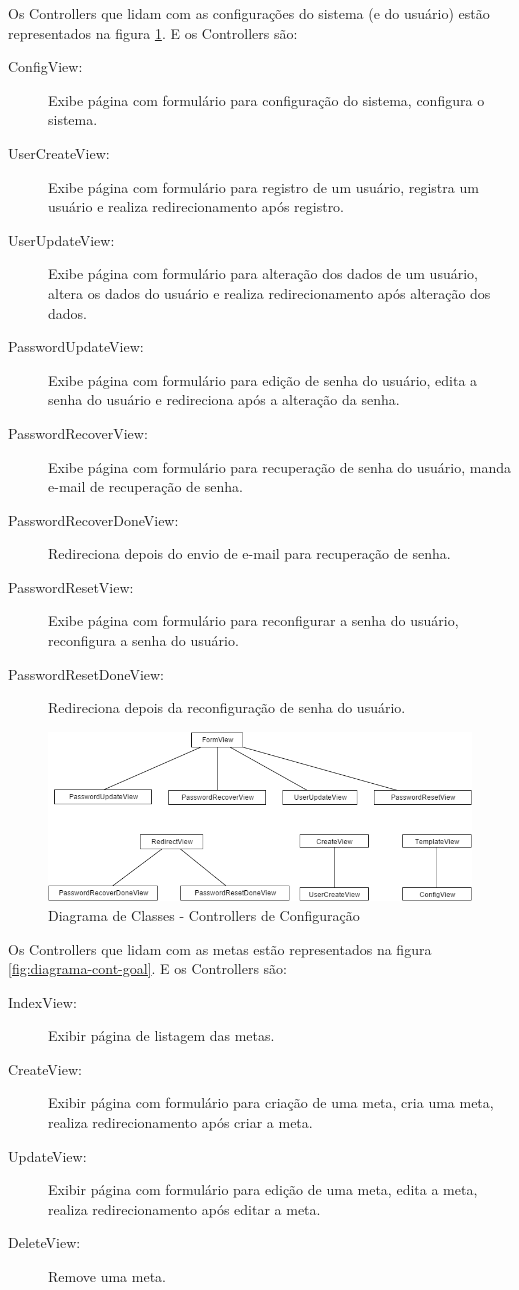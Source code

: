 Os Controllers que lidam com as configurações do sistema (e do usuário) estão representados na figura \ref{fig:diagrama-cont-configuration}. E os Controllers são:
\begin{description}
	\item[ConfigView:] Exibe página com formulário para configuração do sistema, configura o sistema.
	\item[UserCreateView:] Exibe página com formulário para registro de um usuário, registra um usuário e realiza redirecionamento após registro.
	\item[UserUpdateView:] Exibe página com formulário para alteração dos dados de um usuário, altera os dados do usuário e realiza redirecionamento após alteração dos dados.
	\item[PasswordUpdateView:] Exibe página com formulário para edição de senha do usuário, edita a senha do usuário e redireciona após a alteração da senha.
	\item[PasswordRecoverView:] Exibe página com formulário para recuperação de senha do usuário, manda e-mail de recuperação de senha.
	\item[PasswordRecoverDoneView:] Redireciona depois do envio de e-mail para recuperação de senha.
	\item[PasswordResetView:] Exibe página com formulário para reconfigurar a senha do usuário, reconfigura a senha do usuário.
	\item[PasswordResetDoneView:] Redireciona depois da reconfiguração de senha do usuário.
\end{description} 

\begin{figure}[H]
\centering
\includegraphics[width=16cm,keepaspectratio]{figuras/diagrama_cont_configuration.png}
\caption{\label{fig:diagrama-cont-configuration} Diagrama de Classes - Controllers de Configuração}
\end{figure}

Os Controllers que lidam com as metas estão representados na figura \ref{fig:diagrama-cont-goal}. E os Controllers são:
\begin{description}
	\item[IndexView:] Exibir página de listagem das metas.
	\item[CreateView:] Exibir página com formulário para criação de uma meta, cria uma meta, realiza redirecionamento após criar a meta.
	\item[UpdateView:] Exibir página com formulário para edição de uma meta, edita a meta, realiza redirecionamento após editar a meta.
	\item[DeleteView:] Remove uma meta.
\end{description} 

